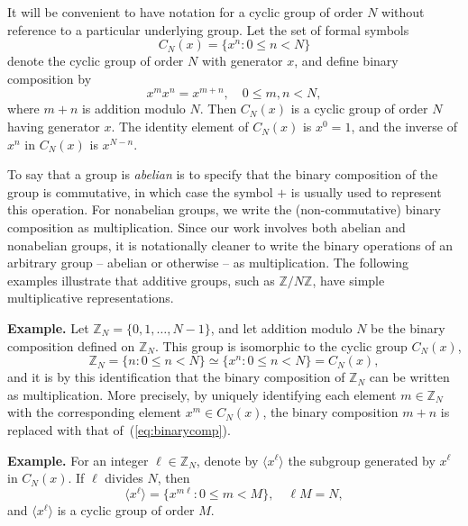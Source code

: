 \documentclass[reqno,onecolumn,oneside]{paper}
\newcommand{\<}{\ensuremath{\langle}}
\renewcommand{\>}{\ensuremath{\rangle}}
\newcommand{\field}[1]{\ensuremath{\mathbb{#1}}}
\newcommand{\Z}{\field{Z}}                   %
\begin{document}
It will be convenient to have notation for a cyclic group of
order $N$ without reference to a particular underlying group.
Let the set of formal symbols
\begin{equation}\label{eq:cyclicGroup}
C_N(x) = \{ x^n : 0 \leq n < N\}
\end{equation} 
denote the cyclic group of order $N$ with
generator $x$, and define binary composition by
\begin{equation}\label{eq:binarycomp}
x^m x^n = x^{m+n}, \quad 0\leq m, n < N,
\end{equation}
where $m+n$ is addition modulo $N$.  Then $C_N(x)$ is a
cyclic group of order $N$ having generator $x$. The identity
element of $C_N(x)$ is $x^0 = 1$, and the inverse of $x^n$
in $C_N(x)$ is $x^{N-n}$.

To say that a group is \emph{abelian} is to specify that the binary
composition of the group is commutative, in which case the
symbol $+$ is usually used to represent this operation.
For nonabelian groups, we write the (non-commutative) binary
composition as multiplication.  Since our work involves
both abelian and nonabelian groups, it is notationally
cleaner to write the binary operations of an arbitrary group --
abelian or otherwise -- as multiplication. The
following examples illustrate that additive groups, such as $\Z/N\Z$, have
simple multiplicative representations. 

\begin{example}
{\bf Example.} Let $\Z_N = \{0, 1, \ldots, N-1\}$,
and let addition modulo $N$ be the binary composition defined on $\Z_N$.
This group is isomorphic to the cyclic group $C_N(x)$, 
\[
\Z_N = \{ n : 0 \leq n < N\} \simeq \{ x^n : 0 \leq n < N\}
= C_N(x),
\]
and it is by this identification that the binary composition
of $\Z_N$ can be written as multiplication. 
More precisely, by uniquely identifying each element $m \in \Z_N$
with the corresponding element $x^m \in C_N(x)$, the binary composition
$m+n$ is replaced with that of~(\ref{eq:binarycomp}).  
\end{example}


\begin{example}
{\bf Example.} For an integer $\ell \in \Z_N$, denote by 
$\<x^\ell\>$ 
the subgroup generated by $x^\ell$ in $C_N(x)$. If $\ell$ divides $N$,
then   
\[
\<x^\ell\> = \{x^{m\ell} : 0\leq m < M\}, \quad \ell M = N,
\]
and $\<x^\ell\>$ is a cyclic group of order $M$.
\end{example}

\end{document}
